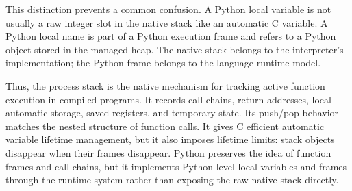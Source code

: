 This distinction prevents a common confusion. A Python local variable is not usually a raw integer slot in the native stack like an automatic C variable. A Python local name is part of a Python execution frame and refers to a Python object stored in the managed heap. The native stack belongs to the interpreter's implementation; the Python frame belongs to the language runtime model.

Thus, the process stack is the native mechanism for tracking active function execution in compiled programs. It records call chains, return addresses, local automatic storage, saved registers, and temporary state. Its push/pop behavior matches the nested structure of function calls. It gives C efficient automatic variable lifetime management, but it also imposes lifetime limits: stack objects disappear when their frames disappear. Python preserves the idea of function frames and call chains, but it implements Python-level local variables and frames through the runtime system rather than exposing the raw native stack directly.